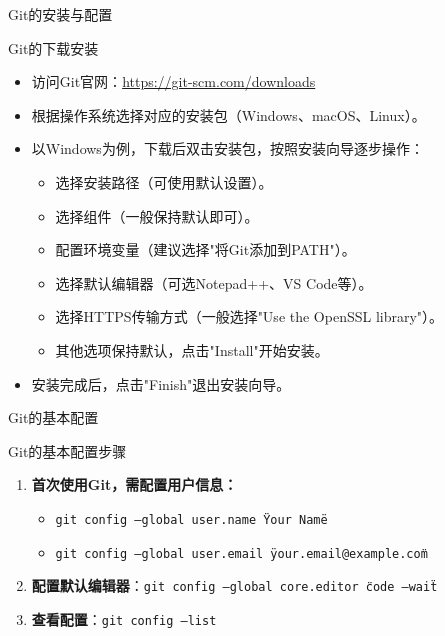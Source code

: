 \documentclass[UTF8,aspectratio=169]{beamer}
\begin{document}
\begin{frame}{Git的安装与配置}
    \begin{ytublock}{Git的下载安装}
        \begin{itemize}
            \item 访问Git官网：\url{https://git-scm.com/downloads}
            \item 根据操作系统选择对应的安装包（Windows、macOS、Linux）。
            \item 以Windows为例，下载后双击安装包，按照安装向导逐步操作：
            \begin{itemize}
                \item 选择安装路径（可使用默认设置）。
                \item 选择组件（一般保持默认即可）。
                \item 配置环境变量（建议选择"将Git添加到PATH"）。
                \item 选择默认编辑器（可选Notepad++、VS Code等）。
                \item 选择HTTPS传输方式（一般选择"Use the OpenSSL library"）。
                \item 其他选项保持默认，点击"Install"开始安装。
            \end{itemize}
            \item 安装完成后，点击"Finish"退出安装向导。
        \end{itemize}
    \end{ytublock}
\end{frame}

\begin{frame}{Git的基本配置}
\begin{ytualertblock}{Git的基本配置步骤}
    \begin{enumerate}
        \item \textbf{首次使用Git，需配置用户信息：}
        \begin{itemize}
            \item \texttt{git config --global user.name \"Your Name\"}
            \item \texttt{git config --global user.email \"your.email@example.com\"}
        \end{itemize}
        \item \textbf{配置默认编辑器}：\texttt{git config --global core.editor \"code --wait\"}
        \item \textbf{查看配置}：\texttt{git config --list}
    \end{enumerate}
\end{ytualertblock}
\end{frame}
\end{document}
